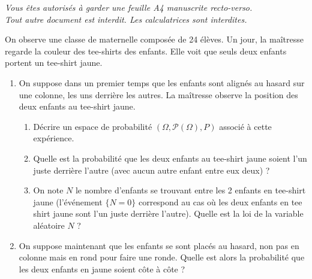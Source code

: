 \documentclass[a4paper,12pt,reqno]{amsart}
\begin{document}
\ifsolutions\else
\hfill\begin{minipage}[c]{.9\textwidth}
\emph{%
  Vous êtes autorisés à garder une feuille A4 manuscrite recto-verso.\\
  Tout autre document est interdit. Les calculatrices sont interdites.
}
\end{minipage}
\tsvp
\vspace*{1.4cm}
\fi


\begin{exo}
  On observe une classe de maternelle composée de 24 élèves. Un jour, la maîtresse regarde la couleur des tee-shirts des enfants. Elle voit que seuls deux enfants portent un tee-shirt jaune.
  \begin{enumerate}
    \item On suppose dans un premier temps que les enfants sont alignés au hasard sur une colonne, les uns derrière les autres. La  maîtresse observe la position des deux enfants au tee-shirt jaune.
    \begin{enumerate}
      \item Décrire un espace de probabilité $(\Omega,\mathcal P(\Omega),P)$ associé à cette expérience.
      \item Quelle est la probabilité que les deux enfants au tee-shirt jaune soient l'un juste derrière l'autre (avec aucun autre enfant entre eux deux) ?
      \item On note $N$ le  nombre d'enfants se trouvant entre les 2 enfants en tee-shirt jaune (l'événement $\{N=0\}$ correspond au cas où les deux enfants en tee shirt jaune sont l'un juste derrière l'autre). Quelle est la loi de la variable aléatoire $N$ ?
    \end{enumerate}
    \item  On suppose maintenant que les enfants se sont placés au hasard, non pas en colonne mais en rond  pour faire une ronde. Quelle est alors la probabilité que les deux enfants en jaune soient côte à côte ?
  \end{enumerate}
\end{exo}
\bigskip
\end{document}
